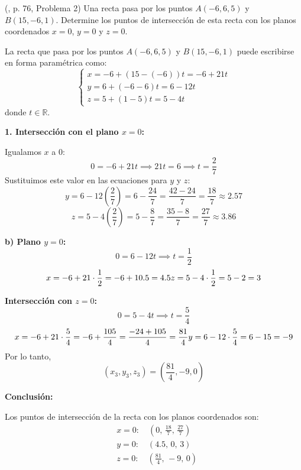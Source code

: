 \begin{prob} (\cite{espinoza2006Algebralineal}, p. 76, Problema 2) Una recta pasa por los puntos $A(-6,6,5)$ y $B(15,-6,1)$. Determine los puntos de intersección de esta recta con los planos coordenados $x=0$, $y=0$ y $z=0$. 

\begin{myproof}
La recta que pasa por los puntos $A(-6,6,5)$ y $B(15,-6,1)$ puede escribirse en forma paramétrica como:
\[
\begin{cases}
x = -6 + (15 - (-6))t = -6 + 21t \\
y = 6 + (-6 - 6)t = 6 - 12t \\
z = 5 + (1 - 5)t = 5 - 4t
\end{cases}
\]
donde $t \in \mathbb{R}$.

\textbf{1. Intersección con el plano $x=0$:}

Igualamos $x$ a $0$:
\[
0 = -6 + 21t \implies 21t = 6 \implies t = \frac{2}{7}
\]
Sustituimos este valor en las ecuaciones para $y$ y $z$:
\[
y = 6 - 12\left(\frac{2}{7}\right) = 6 - \frac{24}{7} = \frac{42 - 24}{7} = \frac{18}{7} \approx 2.57
\]
\[
z = 5 - 4\left(\frac{2}{7}\right) = 5 - \frac{8}{7} = \frac{35 - 8}{7} = \frac{27}{7} \approx 3.86
\]



\textbf{b) Plano $y=0$:}
\[
0 = 6 - 12t \implies t = \frac{1}{2}
\]
\[
x = -6 + 21 \cdot \frac{1}{2} = -6 + 10.5 = 4.5 \\
z = 5 - 4 \cdot \frac{1}{2} = 5 - 2 = 3
\]


\textbf{Intersección con $z=0$:}
\[
0 = 5 - 4t \implies t = \frac{5}{4}
\]
\[
x = -6 + 21 \cdot \frac{5}{4} = -6 + \frac{105}{4} = \frac{-24 + 105}{4} = \frac{81}{4} \\
y = 6 - 12 \cdot \frac{5}{4} = 6 - 15 = -9
\]
Por lo tanto,
\[
(x_3, y_3, z_3) = \left( \frac{81}{4}, -9, 0 \right)
\]

\textbf{Conclusión:}

Los puntos de intersección de la recta con los planos coordenados son:
\[
\boxed{
\begin{aligned}
&x=0: \quad (0,\, \frac{18}{7},\, \frac{27}{7}) \\
&y=0: \quad (4.5,\, 0,\, 3) \\
&z=0: \quad \left(\frac{81}{4},\, -9,\, 0\right)
\end{aligned}
}
\]

\end{myproof}

\end{prob}

